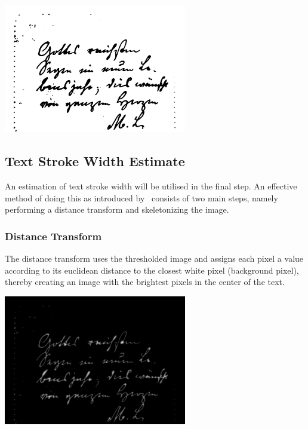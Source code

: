 \documentclass[a4paper]{article}
\begin{document}
\begin{multicols}{2}
    \noindent
    \begin{minipage}{\linewidth}
        \centering
        \includegraphics[width=8cm]{otsu thresholded.png}
        \label{fig:4}
    \end{minipage}

    \subsection{Text Stroke Width Estimate}
    An estimation of text stroke width will be utilised in the final step. An effective method of doing this as introduced by~\cite{strokewidth} consists of two main steps, namely performing a distance transform and skeletonizing the image.

    \subsubsection{Distance Transform}
    The distance transform uses the thresholded image and assigns each pixel a value according to its euclidean distance to the closest white pixel (background pixel), thereby creating an image with the brightest pixels in the center of the text.

    \noindent
    \begin{minipage}{\linewidth}
        \centering
        \includegraphics[width=8cm]{distance transform.png}
        \label{fig:5}
    \end{minipage}


\end{multicols}
\end{document}
